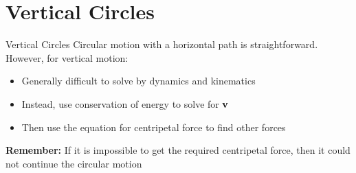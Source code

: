 \documentclass[12pt,compress,aspectratio=169]{beamer}
\newcommand{\mb}[1]{\ensuremath\mathbf{#1}}
\begin{document}
\section{Vertical Circles}

\begin{frame}{Vertical Circles}
  Circular motion with a horizontal path is straightforward. However, for
  vertical motion:
  \begin{itemize}
  \item Generally difficult to solve by dynamics and kinematics
  \item Instead, use conservation of energy to solve for $\mb{v}$
  \item Then use the equation for centripetal force to find other forces
  \end{itemize}

  \textbf{Remember:} If it is impossible to get the required centripetal
  force, then it could not continue the circular motion
\end{frame}
\end{document}
